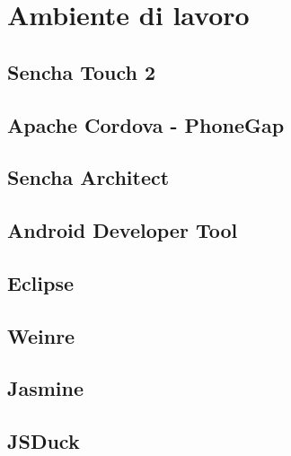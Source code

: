 \chapter{Ambiente di lavoro}\label{ch:ambiente di lavoro}

\section{Sencha Touch 2}

\section{Apache Cordova - PhoneGap}

\section{Sencha Architect}

\section{Android Developer Tool}

\section{Eclipse}

\section{Weinre}

\section{Jasmine}

\section{JSDuck}
